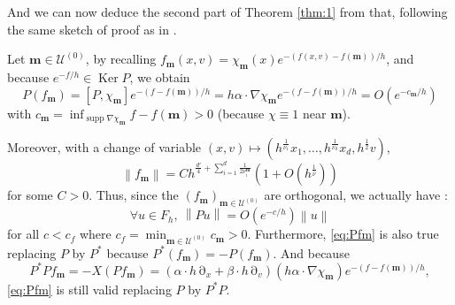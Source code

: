 \documentclass[12pt]{amsart}
\newcommand{\supp}{\operatorname{supp}}
\newcommand{\Ker}{\operatorname{Ker}}
\numberwithin{equation}{section}
\numberwithin{figure}{section}
\def\m{\mathbf{m}}
\DeclareMathOperator{\p}{\partial}
\newcommand{\vvert}[1]{\left\lVert#1\right\rVert}
\def\uuu{{\mathcal U}}\def\vvv{{\mathcal V}}\def\www{{\mathcal W}}\def\xxx{{\mathcal X}}
\begin{document}
And we can now deduce the second part of Theorem \ref{thm:1} from that, following the same sketch of proof as in \cite{No23}.

Let $\m\in\uuu^{(0)}$, by recalling $f_\m(x,v)=\chi_\m(x) e^{-(f(x,v)-f(\m))/h}$, and because $e^{-f/h}\in\Ker P$, we obtain
\begin{equation*}
P(f_\m)= [P,\chi_\m]e^{-(f-f(\m))/h} = h\alpha\cdot\nabla\chi_\m e^{-(f-f(\m))/h} = O(e^{-c_\m/h})
\end{equation*}
with $c_\m=\inf_{\supp\nabla\chi_\m} f-f(\m)>0$ (because $\chi\equiv1$ near $\m$).

Moreover, with a change of variable $(x,v)\mapsto(h^{\frac{1}{\nu_1}}x_1,\ldots,h^{\frac{1}{\nu_d}}x_d,h^{\frac12}v)$,
\begin{equation*}
\vvert{f_\m} = Ch^{\frac{d'}{4} + \sum_{i=1}^d\frac{1}{2\nu_i^\m}}(1+O(h^\frac{1}{\overline\nu}))
\end{equation*}
for some $C>0$. Thus, since the $(f_\m)_{\m\in\uuu^{(0)}}$ are orthogonal, we actually have :
\begin{equation}\label{eq:Pfm}
\forall u\in F_h,\ \vvert{Pu}=O(e^{-c/h})\vvert{u}
\end{equation}
for all $c<c_f$ where $c_f=\min_{\m\in\uuu^{(0)}}c_\m>0$. Furthermore, \eqref{eq:Pfm} is also true replacing $P$ by $P^*$ because $P^*(f_\m)=-P(f_\m)$. And because
\begin{equation*}
P^*Pf_\m = -X(Pf_\m) = (\alpha\cdot h\p_x + \beta\cdot h\p_v)(h\alpha\cdot\nabla\chi_\m)e^{-(f-f(\m))/h},
\end{equation*}
\eqref{eq:Pfm} is still valid replacing $P$ by $P^*P$.
\end{document}
